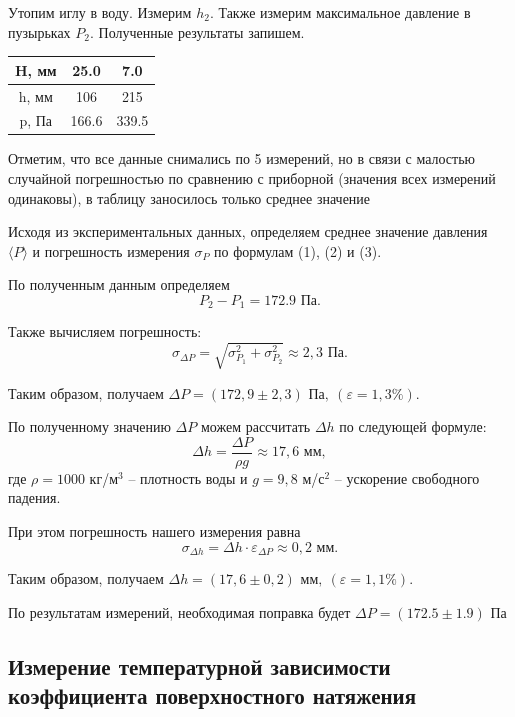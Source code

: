 \documentclass[12pt,a4paper]{article}
\begin{document}
Утопим иглу в воду. Измерим $ h_2 $. Также измерим максимальное давление в пузырьках $ P_2 $. Полученные результаты запишем.

\begin{center}
\begin{tabular}{|c|c|c|}
\hline 
H, мм & 25.0 & 7.0 \\ 
\hline 
h, мм & 106 & 215 \\
\hline
p, Па & 166.6 & 339.5 \\ 
\hline 
\end{tabular} 
\end{center}

Отметим, что все данные снимались по 5 измерений, но в связи с малостью случайной погрешностью по сравнению с приборной (значения всех измерений одинаковы), в таблицу заносилось только среднее значение

Исходя из экспериментальных данных, определяем среднее значение давления $ \langle P \rangle $ и погрешность измерения $ \sigma_{P} $ по формулам (1), (2) и (3).

По полученным данным определяем \[ P_2-P_1 = 172.9 \text{ Па}. \]

Также вычисляем погрешность:  \begin{equation}\label{pogr_sum}
\sigma_{\Delta P} = \sqrt{\sigma^2_{P_1}+\sigma^2_{P_2}} \approx 2,3 \text{ Па}.
\end{equation}

Таким образом, получаем $ {\Delta P = (172,9 \pm 2,3) \text{ Па},} \: (\varepsilon = 1,3\%).$

По полученному значению $ \Delta P $ можем рассчитать $ \Delta h $ по следующей формуле: \[ \Delta h = \frac{\Delta P}{\rho g} \approx 17,6 \text{ мм}, \] где $ \rho = 1000 $ кг/$ \text{м}^3 $ -- плотность воды и $ g = 9,8 $ м/$ \text{с}^2 $ -- ускорение свободного падения.

\medskip

При этом погрешность нашего измерения равна \[ \sigma_{\Delta h} = \Delta h \cdot \varepsilon_{\Delta P} \approx 0,2 \text{ мм}. \]

Таким образом, получаем $ {\Delta h = (17,6 \pm 0,2) \text{ мм}}, \: (\varepsilon = 1,1\%). $

По результатам измерений, необходимая поправка будет $\Delta{P} = (172.5 \pm 1.9)$ Па

\subsection{Измерение температурной зависимости коэффициента поверхностного натяжения}
\end{document}
